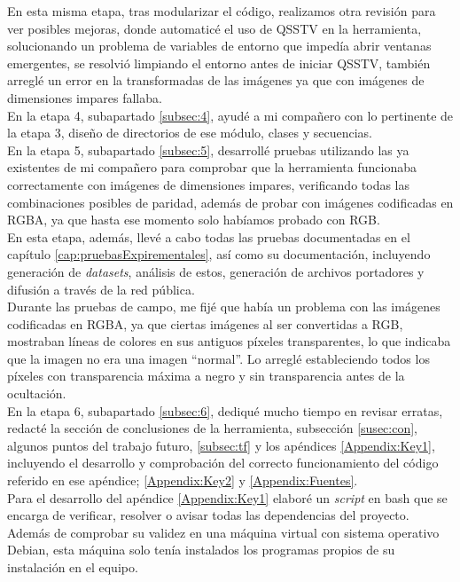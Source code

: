 En esta misma etapa, tras modularizar el código, realizamos otra revisión para ver posibles mejoras, donde automaticé el uso de QSSTV en la herramienta, solucionando un problema de variables de entorno que impedía abrir ventanas emergentes, se resolvió limpiando el entorno antes de iniciar QSSTV, también arreglé un error en la transformadas de las imágenes ya que con imágenes de dimensiones impares fallaba.
\\

En la etapa 4, subapartado \ref{subsec:4}, ayudé a mi compañero con lo pertinente de la etapa 3, diseño de directorios de ese módulo, clases y secuencias.\\

En la etapa 5,  subapartado \ref{subsec:5}, desarrollé pruebas utilizando las ya existentes de mi compañero para comprobar que la herramienta funcionaba correctamente con imágenes de dimensiones impares, verificando todas las combinaciones posibles de paridad, además de probar con imágenes codificadas en RGBA, ya que hasta ese momento solo habíamos probado con RGB.\\

En esta etapa, además, llevé a cabo todas las pruebas documentadas en el capítulo \ref{cap:pruebasExpirementales}, así como su documentación, incluyendo generación de \textit{datasets}, análisis de estos, generación de archivos portadores y difusión a través de la red pública.\\

Durante las pruebas de campo, me fijé que había un problema con las imágenes codificadas en RGBA, ya que ciertas imágenes al ser convertidas a RGB, mostraban líneas de colores en sus antiguos píxeles transparentes, lo que indicaba  que la imagen no era una imagen ``normal''. Lo arreglé estableciendo  todos los píxeles con transparencia máxima a negro y sin transparencia antes de la ocultación.  \\

En la etapa 6, subapartado \ref{subsec:6}, dediqué  mucho tiempo en revisar erratas, redacté la sección de conclusiones de la herramienta, subsección \ref{susec:con}, algunos puntos del trabajo futuro, \ref{subsec:tf} y los apéndices \ref{Appendix:Key1}, incluyendo el desarrollo y comprobación del correcto funcionamiento del código referido en ese apéndice; \ref{Appendix:Key2} y \ref{Appendix:Fuentes}.\\

Para el desarrollo del apéndice \ref{Appendix:Key1} elaboré  un \textit{script} en bash que se encarga de verificar, resolver o avisar todas las dependencias del proyecto. Además de comprobar su validez en una máquina virtual con sistema operativo Debian, esta máquina solo tenía instalados los programas propios de su instalación en el equipo.\\ 


